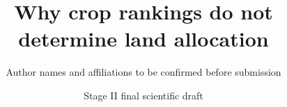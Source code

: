\title{Why crop rankings do not determine land allocation}
\author{Author names and affiliations to be confirmed before submission}
\date{Stage II final scientific draft}
